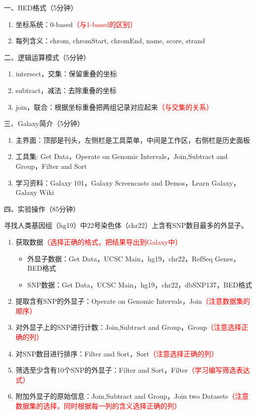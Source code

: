 \documentclass{TIJMUjiaoanSY}
\begin{document}

\firstTail


\newpage
\otherHeader

\noindent
一、BED格式（5分钟）
\begin{enumerate}
  \item 坐标系统：0-based\textcolor{red}{（与1-based的区别）}
  \item 每列含义：chrom, chromStart, chromEnd, name, score, strand
\end{enumerate}

\noindent
二、逻辑运算模式（5分钟）
\begin{enumerate}
  \item intersect，交集：保留重叠的坐标
  \item subtract，减法：去除重叠的坐标
  \item join，联合：根据坐标重叠把两组记录对应起来\textcolor{red}{（与交集的关系）}
\end{enumerate}

\noindent
三、Galaxy简介（5分钟）
\begin{enumerate}
  \item 主界面：顶部是刊头，左侧栏是工具菜单，中间是工作区，右侧栏是历史面板
  \item 工具集: Get Data，Operate on Genomic Intervals，Join,Subtract and Group，Filter and Sort
  \item 学习资料：Galaxy 101，Galaxy Screencasts and Demos，Learn Galaxy，Galaxy Wiki
\end{enumerate}

\noindent
四、实验操作（85分钟）

寻找人类基因组（hg19）中22号染色体（chr22）上含有SNP数目最多的外显子。
\begin{enumerate}
  \item 获取数据\textcolor{red}{（选择正确的格式，把结果导出到Galaxy中）}
    \begin{itemize}
      \item 外显子数据：Get Data，UCSC Main，hg19，chr22，RefSeq Genes，BED格式
      \item SNP数据：Get Data，UCSC Main，hg19，chr22，dbSNP137，BED格式
    \end{itemize}
  \item 提取含有SNP的外显子：Operate on Genomic Intervals，Join\textcolor{red}{（注意数据集的顺序）}
  \item 对外显子上的SNP进行计数：Join,Subtract and Group，Group\textcolor{red}{（注意选择正确的列）}
  \item 对SNP数目进行排序：Filter and Sort，Sort\textcolor{red}{（注意选择正确的列）}
  \item 筛选至少含有10个SNP的外显子：Filter and Sort，Filter\textcolor{red}{（学习编写筛选表达式）}
  \item 附加外显子的原始信息：Join,Subtract and Group，Join two Datasets\textcolor{red}{（注意数据集的选择，同时根据每一列的含义选择正确的列）}
\end{enumerate}


\otherTail
\end{document}
